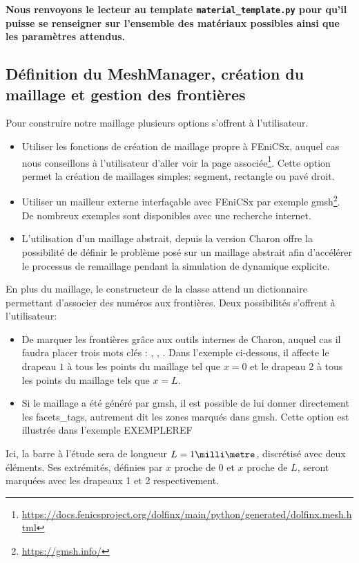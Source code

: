 \documentclass[10pt]{book}
\newenvironment{Encadre}[1]{
\par\medskip
\begin{tcolorbox}[colback=gray!10, colframe=lightgray, boxrule=1pt, arc=2pt]
\textbf{#1}
\end{tcolorbox}
\par\medskip
}{}
\begin{document}
\begin{Encadre}{
Nous renvoyons le lecteur au template \texttt{material\_template.py} pour qu'il puisse se renseigner sur l'ensemble des matériaux possibles ainsi que les paramètres attendus.
}\end{Encadre}
\subsection{Définition du MeshManager, création du maillage et gestion des frontières} 
Pour construire notre maillage plusieurs options s'offrent à l'utilisateur. 
\begin{itemize}
\item Utiliser les fonctions de création de maillage propre à FEniCSx, auquel cas nous conseillons à l'utilisateur d'aller voir la page associée\footnote{\url{https://docs.fenicsproject.org/dolfinx/main/python/generated/dolfinx.mesh.html}}. Cette option permet la création de maillages simples: segment, rectangle ou pavé droit.
\item Utiliser un mailleur externe interfaçable avec FEniCSx par exemple gmsh\footnote{\url{https://gmsh.info/}}. De nombreux exemples sont disponibles avec une recherche internet.
\item L'utilisation d'un maillage abstrait, depuis la version Charon offre la possibilité de définir le problème posé sur un maillage abstrait afin d’accélérer le processus de remaillage pendant la simulation de dynamique explicite.
\end{itemize}
\begin{figure}[h!]

\end{figure}
En plus du maillage, le constructeur de la classe  attend un dictionnaire permettant d'associer des numéros aux frontières. Deux possibilités s'offrent à l'utilisateur:
\begin{itemize}
\item De marquer les frontières grâce aux outils internes de Charon, auquel cas il faudra placer trois mots clés : , , . Dans l'exemple ci-dessous, il affecte le drapeau $1$ à tous les points du maillage tel que $x=0$ et le drapeau 2 à tous les points du maillage tels que $x=L$.
\item Si le maillage a été généré par gmsh, il est possible de lui donner directement les facets\_tags, autrement dit les zones marqués dans gmsh. Cette option est illustrée dans l'exemple EXEMPLEREF
\end{itemize}
Ici, la barre à l'étude sera de longueur $L=1\milli\metre$, discrétisé avec deux éléments. Ses extrémités, définies par $x$ proche de 0 et $x$ proche de $L$, seront marquées avec les drapeaux 1 et 2 respectivement.
\end{document}
